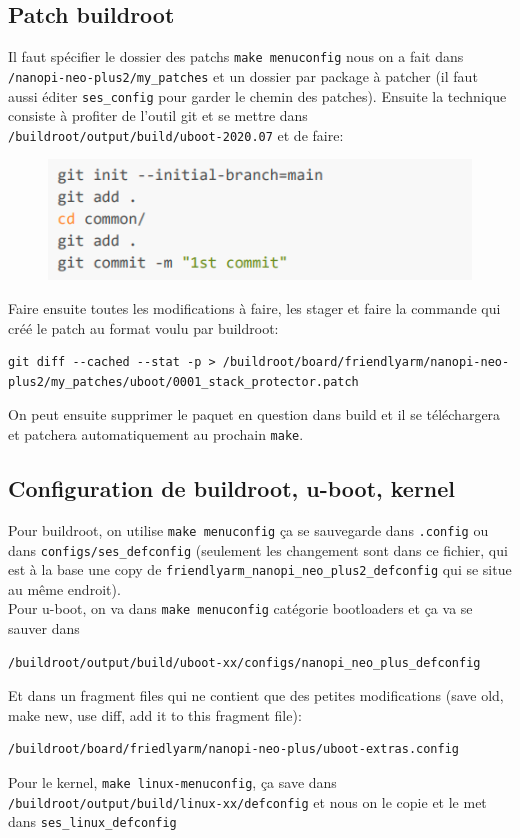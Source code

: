 \subsection{Patch buildroot}
Il faut spécifier le dossier des patchs \verb!make menuconfig! nous on a fait dans \verb!/nanopi-neo-plus2/my_patches! et un dossier par package à patcher (il faut aussi éditer \verb!ses_config! pour garder le chemin des patches). Ensuite la technique consiste à profiter de l'outil git et se mettre dans \verb!/buildroot/output/build/uboot-2020.07! et de faire:
\begin{figure}[H]
\centering
\includegraphics[width=0.9\columnwidth]{Figures/buildroot_03.png}
\end{figure}
Faire ensuite toutes les modifications à faire, les stager et faire la commande qui créé le patch au format voulu par buildroot:
\begin{lstlisting}[style=bash]
git diff --cached --stat -p > /buildroot/board/friendlyarm/nanopi-neo-plus2/my_patches/uboot/0001_stack_protector.patch
\end{lstlisting}
On peut ensuite supprimer le paquet en question dans build et il se téléchargera et patchera automatiquement au prochain \verb!make!.
\subsection{Configuration de buildroot, u-boot, kernel}
Pour buildroot, on utilise \verb!make menuconfig! ça se sauvegarde dans \verb!.config! ou dans \verb!configs/ses_defconfig! (seulement les changement sont dans ce fichier, qui est à la base une copy de \verb!friendlyarm_nanopi_neo_plus2_defconfig! qui se situe au même endroit).\\
Pour u-boot, on va dans \verb!make menuconfig! catégorie bootloaders et ça va se sauver dans 
\begin{lstlisting}[style=bash]
/buildroot/output/build/uboot-xx/configs/nanopi_neo_plus_defconfig
\end{lstlisting}
Et dans un fragment files qui ne contient que des petites modifications (save old, make new, use diff, add it to this fragment file): 
\begin{lstlisting}[style=bash]
/buildroot/board/friedlyarm/nanopi-neo-plus/uboot-extras.config
\end{lstlisting}
Pour le kernel, \verb!make linux-menuconfig!, ça save dans \verb!/buildroot/output/build/linux-xx/defconfig! et nous on le copie et le met dans \verb!ses_linux_defconfig!
